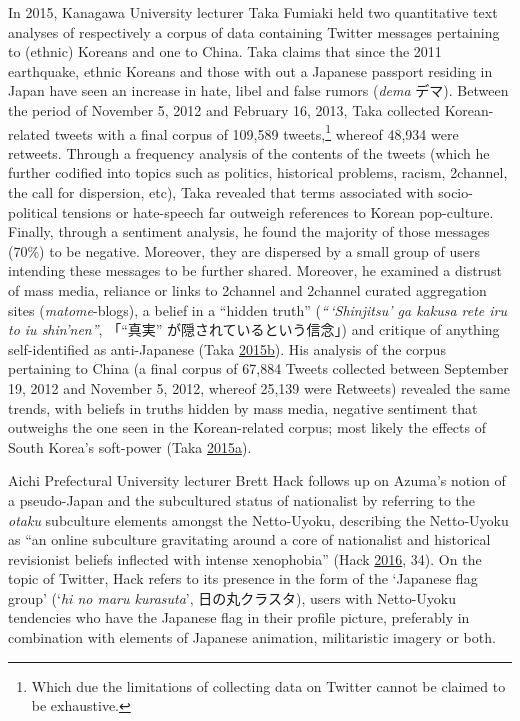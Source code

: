 \documentclass[10pt,british,A4paper,,openany]{memoir}
\begin{document}
In 2015, Kanagawa University lecturer Taka Fumiaki held two quantitative
text analyses of respectively a corpus of data containing Twitter
messages pertaining to (ethnic) Koreans and one to China. Taka claims
that since the 2011 earthquake, ethnic Koreans and those with out a
Japanese passport residing in Japan have seen an increase in hate, libel
and false rumors (\emph{dema} デマ). Between the period of November 5,
2012 and February 16, 2013, Taka collected Korean-related tweets with a
final corpus of 109,589 tweets,\footnote{Which due the limitations of
  collecting data on Twitter cannot be claimed to be exhaustive.}
whereof 48,934 were retweets. Through a frequency analysis of the
contents of the tweets (which he further codified into topics such as
politics, historical problems, racism, 2channel, the call for
dispersion, etc), Taka revealed that terms associated with
socio-political tensions or hate-speech far outweigh references to
Korean pop-culture. Finally, through a sentiment analysis, he found the
majority of those messages (70\%) to be negative. Moreover, they are
dispersed by a small group of users intending these messages to be
further shared. Moreover, he examined a distrust of mass media, reliance
or links to 2channel and 2channel curated aggregation sites
(\emph{matome}-blogs), a belief in a ``hidden truth''
(\emph{``\,`Shinjitsu' ga kakusa rete iru to iu shin'nen''}, 「``真実''
が隠されているという信念」) and critique of anything self-identified as
anti-Japanese (Taka
\protect\hyperlink{ref-taka_twitter_2015-1}{2015}\protect\hyperlink{ref-taka_twitter_2015-1}{b}).
His analysis of the corpus pertaining to China (a final corpus of 67,884
Tweets collected between September 19, 2012 and November 5, 2012,
whereof 25,139 were Retweets) revealed the same trends, with beliefs in
truths hidden by mass media, negative sentiment that outweighs the one
seen in the Korean-related corpus; most likely the effects of South
Korea's soft-power (Taka
\protect\hyperlink{ref-taka_twitter_2015}{2015}\protect\hyperlink{ref-taka_twitter_2015}{a}).

Aichi Prefectural University lecturer Brett Hack follows up on Azuma's
notion of a pseudo-Japan and the subcultured status of nationalist by
referring to the \emph{otaku} subculture elements amongst the
Netto-Uyoku, describing the Netto-Uyoku as ``an online subculture
gravitating around a core of nationalist and historical revisionist
beliefs inflected with intense xenophobia'' (Hack
\protect\hyperlink{ref-hack_subculture_2016}{2016}, 34). On the topic of
Twitter, Hack refers to its presence in the form of the `Japanese flag
group' (`\emph{hi no maru kurasuta}', 日の丸クラスタ), users with
Netto-Uyoku tendencies who have the Japanese flag in their profile
picture, preferably in combination with elements of Japanese animation,
militaristic imagery or both.
\end{document}
